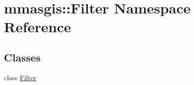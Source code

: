 \hypertarget{namespacemmasgis_1_1Filter}{
\section{mmasgis::Filter Namespace Reference}
\label{namespacemmasgis_1_1Filter}
}
\subsection*{Classes}
\begin{DoxyCompactItemize}
\item 
class \hyperlink{classmmasgis_1_1Filter_1_1Filter}{Filter}
\end{DoxyCompactItemize}
